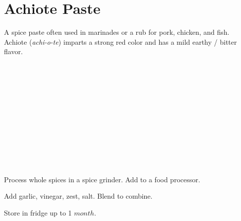\section[Achiote Paste]{Achiote Paste}\label{achiote_paste_RM}

\begin{recipestats}[
        servings=\onehalf~$C$,
        preptime=15 \minute,
        source=\citeauthor{rMartinezAchiote}~\cite{rMartinezAchiote},
    ]
\end{recipestats}

\begin{recipeabstract}
    A spice paste often used in marinades or a rub for pork, chicken, and fish.
    Achiote (\textit{achi-o-te}) imparts a strong red color and has a mild earthy / bitter flavor.
\end{recipeabstract}

\begin{ingredientcolumns}
    \begin{ingredientblock}
        \\
        \\
        \\
        \\
        \\
    \end{ingredientblock}
    \begin{ingredientblock}
        \\
        \\
        \\
        \\
        \\
    \end{ingredientblock}
\end{ingredientcolumns}

\begin{preparation}
\item Process whole spices in a spice grinder.
    Add to a food processor.

\item Add garlic, vinegar, zest, salt.
    Blend to combine.

\item Store in fridge up to 1 $month$.
\end{preparation}

\recipeend%
